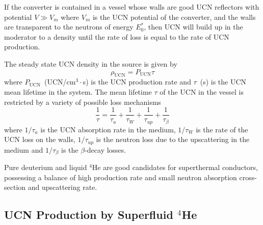 If the converter is contained in a vessel whose walls are good UCN
reflectors with potential $V \gg V_m$ where $V_m$ is the UCN potential
of the converter, and the walls are transparent to the neutrons of
energy $E_0^*$, then UCN will build up in the moderator to a density
until the rate of loss is equal to the rate of UCN production.


The steady state UCN density in the source is given by
\begin{equation}
\label{ucndensity}
\rho_{\text{UCN}}=P_{\text{UCN}} \tau
\end{equation}
where $P_{\text{UCN}}$~(UCN/cm$^3 \cdot$s) is the UCN production rate
and $\tau$~(s) is the UCN mean lifetime in the system.  The mean
lifetime $\tau$ of the UCN in the vessel is restricted by a variety of
possible loss mechanisms
\begin{equation}
\frac{1}{\tau} = \frac{1}{\tau_a}+ \frac{1}{\tau_W}+\frac{1}{\tau_{up}}+\frac{1}{\tau_{\beta}}
\end{equation}
where $1/\tau_a$ is the UCN absorption rate in the medium, $1/\tau_W$
is the rate of the UCN loss on the walls, $1/\tau_{up}$ is the neutron
loss due to the upscattering in the medium and $1/\tau_{\beta}$ is the
$\beta$-decay losses.

Pure deuterium and liquid $^4$He are good candidates for superthermal
conductors, possessing a balance of high production rate and small
neutron absorption cross-section and upscattering rate.


\subsection{UCN Production by Superfluid $^4$He}


